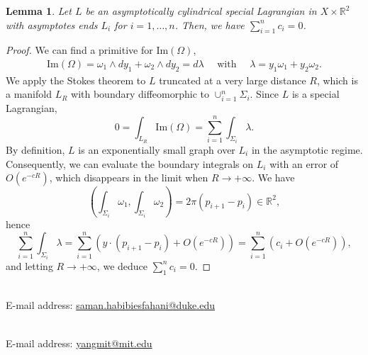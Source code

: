 \documentclass[11pt]{article}
\newtheorem{lemma}{Lemma}
\begin{document}
\begin{lemma}
Let $L$ be an asymptotically cylindrical special Lagrangian in $X\times \mathbb{R}^2$ with asymptotes ends $L_i$ for $i=1,\ldots, n$. Then, we have $\sum_{i=1}^n c_i=0$.
\end{lemma}





\begin{proof}
We can find a primitive for $\text{Im}(\Omega)$,
\begin{align*}
   \text{Im} (\Omega) = \omega_1 \wedge dy_1 + \omega_2 \wedge dy_2 = d \lambda \quad \text{ with } \quad \lambda =  y_1 \omega_1+y_2 \omega_2 .
\end{align*}
We apply the Stokes theorem to $L$ truncated at a very large distance $R$, which is a manifold $L_R$ with boundary diffeomorphic to $\cup_{i=1}^n \Sigma_i$. Since $L$ is a special Lagrangian,
\[
  0 = \int_{L_R}\text{Im}(\Omega) =
   \sum_{i=1}^n  \int_{\Sigma_i} \lambda. 
\]
By definition, $L$ is an exponentially small graph over $L_i$ in the asymptotic regime. Consequently, we can evaluate the boundary integrals on $L_i$ with an error of $O(e^{-cR})$, which disappears in the limit when $R\to +\infty$. We have
\[
(\int_{\Sigma_i} \omega_1, \int_{\Sigma_i}\omega_2)= 2\pi (p_{i+1}-p_i) \in \mathbb{R}^2,
\]
hence 
\[
\sum_{i=1}^n  \int_{\Sigma_i} \lambda=\sum_{i=1}^n \left( y\cdot (p_{i+1}-p_i) +O(e^{-cR}) \right) =\sum_{i=1}^n \left( c_i +O(e^{-cR}) \right),
\]
and letting $R\to +\infty$, we deduce $\sum_1^n c_i=0$.
\end{proof}








\printbibliography

\noindent
\author{Department of Mathematics, Duke University, 120 Science Dr, Durham, NC 27708-0320} \\ E-mail address: \href{ mailto:Saman.HabibiEsfahani@msri.org}{saman.habibiesfahani@duke.edu} 


\vspace{10pt}

\noindent
\author{Department of Mathematics, Massachusetts Institute of Technology, 77 Massachusetts Avenue, Cambridge, MA 02139
} \\ E-mail address: \href{ mailto:yangmit@mit.edu}{yangmit@mit.edu} 
\end{document}
